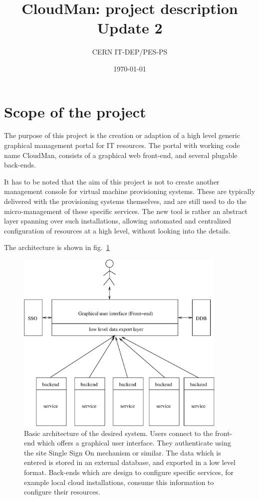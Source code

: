 \documentclass[12pt]{article}
\begin{document}
\thispagestyle{empty}
\title{CloudMan: project description Update 2}
\author{CERN IT-DEP/PES-PS}
\date{\today}
\maketitle 
\begin{abstract}
\end{abstract}

\tableofcontents
\listoffigures 

\section{Scope of the project} 
The purpose of this project is the creation or adaption of a high level generic graphical management portal for IT resources.
The portal with working code name CloudMan, consists of a graphical web front-end, and several plugable back-ends. 

It has to be noted that the aim of this project is not to create another management console for virtual machine provisioning systems. These
are typically delivered with the provisioning systems themselves, and are still used to do the micro-management of these specific services.
The new tool is rather an abstract layer spanning over such installations, allowing automated and centralized configuration of resources at 
a high level, without looking into the details.

The architecture is shown in fig.~\ref{architecture}

\begin{figure}
\begin{center}
\includegraphics[width=0.9\textwidth]{architecture.eps}
\caption{\label{architecture} Basic architecture of the desired system. Users connect to the front-end which offers a graphical user interface. They authenticate using the site Single Sign On mechanism or similar. The data which is entered is stored in an external database, and exported in a low level format. Back-ends which are design to configure specific services, for example local cloud installations, consume this information to configure their resources.}
\end{center}
\end{figure}
\end{document}
